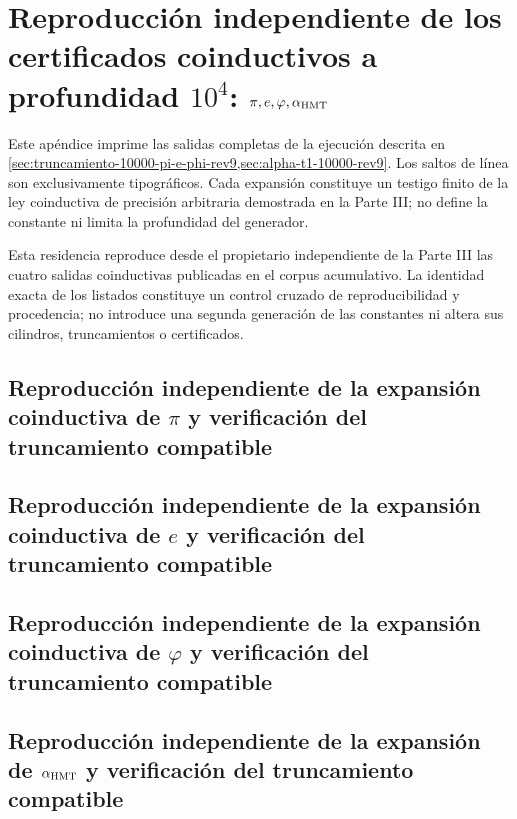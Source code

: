 \chapter{Reproducción independiente de los certificados coinductivos a profundidad \texorpdfstring{\(10^4\)}{10^4}: \texorpdfstring{\(\pi,e,\varphi,\alpha_{\rm HMT}\)}{pi, e, phi, alpha HMT}}
\label{app:desarrollos-10000-rev9-p3-procedencia}

Este apéndice imprime las salidas completas de la ejecución descrita en
\cref{sec:truncamiento-10000-pi-e-phi-rev9,sec:alpha-t1-10000-rev9}. Los
saltos de línea son exclusivamente tipográficos. Cada expansión constituye
un testigo finito de la ley coinductiva de precisión arbitraria demostrada en
la Parte III; no define la constante ni limita la profundidad del generador.

\begingroup
\lstset{basicstyle=\ttfamily\tiny,breaklines=true,breakatwhitespace=false,
  frame=single,columns=fullflexible,keepspaces=true,numbers=none}

Esta residencia reproduce desde el propietario independiente de la Parte III
las cuatro salidas coinductivas publicadas en el corpus acumulativo. La
identidad exacta de los listados constituye un control cruzado de
reproducibilidad y procedencia; no introduce una segunda generación de las
constantes ni altera sus cilindros, truncamientos o certificados.

\section{Reproducción independiente de la expansión coinductiva de \(\pi\) y verificación del truncamiento compatible}


\section{Reproducción independiente de la expansión coinductiva de \(e\) y verificación del truncamiento compatible}


\section{Reproducción independiente de la expansión coinductiva de \(\varphi\) y verificación del truncamiento compatible}



\section{Reproducción independiente de la expansión de \texorpdfstring{\(\alpha_{\rm HMT}\)}{alpha HMT} y verificación del truncamiento compatible}

\endgroup
